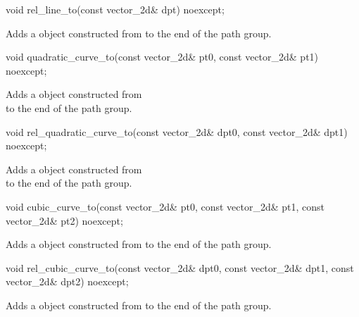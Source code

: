 %
\begin{itemdecl}
void rel_line_to(const vector_2d& dpt) noexcept;
\end{itemdecl}
\begin{itemdescr}
\pnum
\effects
Adds a  object constructed from  to the end of the path group.
\end{itemdescr}

%
\begin{itemdecl}
void quadratic_curve_to(const vector_2d& pt0, const vector_2d& pt1) noexcept;
\end{itemdecl}
\begin{itemdescr}
\pnum
\effects
Adds a  object constructed from\\  to the end of the path group.
\end{itemdescr}

%
\begin{itemdecl}
void rel_quadratic_curve_to(const vector_2d& dpt0, const vector_2d& dpt1)
  noexcept;
\end{itemdecl}
\begin{itemdescr}
\pnum
\effects
Adds a  object constructed from\\  to the end of the path group.
\end{itemdescr}

%
\begin{itemdecl}
void cubic_curve_to(const vector_2d& pt0, const vector_2d& pt1,
  const vector_2d& pt2) noexcept;
\end{itemdecl}
\begin{itemdescr}
\pnum
\effects
\pnum
Adds a  object constructed from  to the end of the path group.
\end{itemdescr}

%
\begin{itemdecl}
void rel_cubic_curve_to(const vector_2d& dpt0, const vector_2d& dpt1,
  const vector_2d& dpt2) noexcept;
\end{itemdecl}
\begin{itemdescr}
\pnum
\effects
Adds a  object constructed from  to the end of the path group.
\end{itemdescr}

